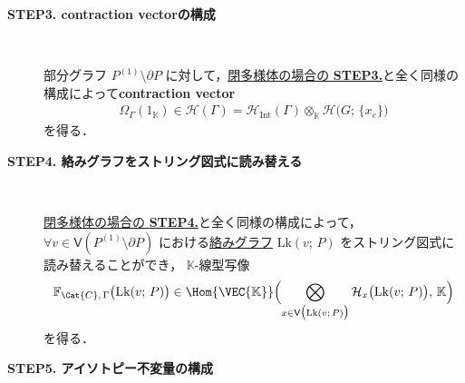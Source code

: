 \documentclass[TQFT_main]{subfiles}
\begin{document}
\begin{description}
    \item[\textbf{STEP3. contraction vectorの構成}]　
    
    部分グラフ $P^{(1)} \setminus \partial P$ に対して，\hyperref[TV:STEP3]{閉多様体の場合の \textsf{\textbf{STEP3.}}}と全く同様の構成によって\textbf{contraction vector}
    \begin{align}
        \label{eq:contraction-bdy}
        \Omega_\Gamma (1_{\mathbb{K}}) \in \mathcal{H} (\Gamma) = \mathcal{H}_{\text{Int}} (\Gamma) \otimes_{\mathbb{K}} \mathcal{H} \bigl(G;\, \{x_e\}\bigr)
    \end{align}
    を得る．

    \item[\textbf{STEP4. 絡みグラフをストリング図式に読み替える}]　
    
    \hyperref[TV:STEP4]{閉多様体の場合の \textsf{\textbf{STEP4.}}}と全く同様の構成によって， $\forall v  \in \mathsf{V}(P^{(1)} \setminus \partial P)$ における\hyperref[def:linkedG]{絡みグラフ} $\mathrm{Lk} (v;\, P)$ をストリング図式に読み替えることができ，
    $\mathbb{K}$-線型写像
    \begin{align}
        \mathbb{F}_{\Cat{C},\, \Gamma} \bigl( \mathrm{Lk}(v;\, P) \bigr) \in \Hom{\VEC{\mathbb{K}}} \Bigl( \bigotimes_{x \in \mathsf{V} \bigl( \mathrm{Lk}(v;\, P) \bigr) } \mathcal{H}_x \bigl( \mathrm{Lk}(v;\, P) \bigr),\, \mathbb{K} \Bigr) 
    \end{align}
    を得る．

    \item[\textbf{STEP5. アイソトピー不変量の構成}]　
    

\end{description}
\end{document}
